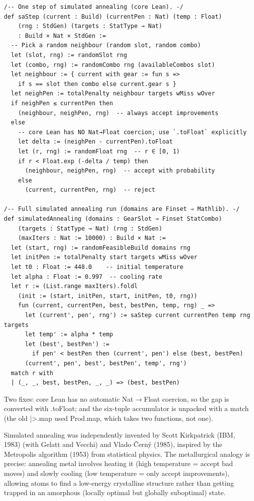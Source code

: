 \documentclass[11pt, a4paper, oneside]{book}
\newcommand{\li}[1]{{\ttfamily\small\color{deepblue}#1}}
\begin{document}
\begin{leanbox}[title={Lean 4 (Mathlib) --- Simulated Annealing}]
\begin{verbatim}
/-- One step of simulated annealing (core Lean). -/
def saStep (current : Build) (currentPen : Nat) (temp : Float)
    (rng : StdGen) (targets : StatType → Nat)
    : Build × Nat × StdGen :=
  -- Pick a random neighbour (random slot, random combo)
  let (slot, rng) := randomSlot rng
  let (combo, rng) := randomCombo rng (availableCombos slot)
  let neighbour := { current with gear := fun s =>
    if s == slot then combo else current.gear s }
  let neighPen := totalPenalty neighbour targets wMiss wOver
  if neighPen ≤ currentPen then
    (neighbour, neighPen, rng)  -- always accept improvements
  else
    -- core Lean has NO Nat→Float coercion; use `.toFloat` explicitly
    let delta := (neighPen - currentPen).toFloat
    let (r, rng) := randomFloat rng  -- r ∈ [0, 1)
    if r < Float.exp (-delta / temp) then
      (neighbour, neighPen, rng)  -- accept with probability
    else
      (current, currentPen, rng)  -- reject

/-- Full simulated annealing run (domains are Finset ⇒ Mathlib). -/
def simulatedAnnealing (domains : GearSlot → Finset StatCombo)
    (targets : StatType → Nat) (rng : StdGen)
    (maxIters : Nat := 10000) : Build × Nat :=
  let (start, rng) := randomFeasibleBuild domains rng
  let initPen := totalPenalty start targets wMiss wOver
  let t0 : Float := 448.0    -- initial temperature
  let alpha : Float := 0.997  -- cooling rate
  let r := (List.range maxIters).foldl
    (init := (start, initPen, start, initPen, t0, rng))
    fun (current, currentPen, best, bestPen, temp, rng) _ =>
      let (current', pen', rng') := saStep current currentPen temp rng targets
      let temp' := alpha * temp
      let (best', bestPen') :=
        if pen' < bestPen then (current', pen') else (best, bestPen)
      (current', pen', best', bestPen', temp', rng')
  match r with
  | (_, _, best, bestPen, _, _) => (best, bestPen)
\end{verbatim}
\end{leanbox}

Two fixes: core Lean has no automatic \li{Nat}$\to$\li{Float} coercion, so the
gap is converted with \li{.toFloat}; and the six-tuple accumulator is unpacked
with a \li{match} (the old \li{|>.map} used \li{Prod.map}, which takes two
functions, not one).

\begin{histbox}
Simulated annealing was independently invented by Scott Kirkpatrick (IBM, 1983)
(with Gelatt and Vecchi) and Vlado \v{C}ern\'{y} (1985), inspired by the
Metropolis algorithm (1953) from statistical physics.  The metallurgical analogy is precise:
annealing metal involves heating it (high temperature = accept bad moves)
and slowly cooling (low temperature = only accept improvements), allowing
atoms to find a low-energy crystalline structure rather than getting trapped
in an amorphous (locally optimal but globally suboptimal) state.
\end{histbox}
\end{document}
